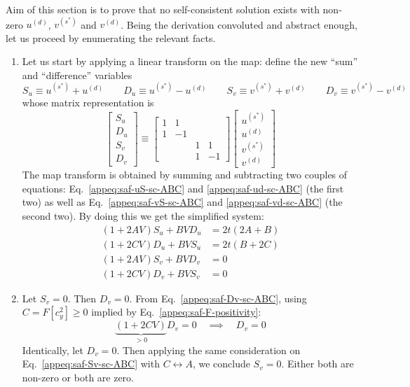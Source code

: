 Aim of this section is to prove that no self-consistent solution exists with non-zero $u^{(d)}$, $v^{(s^*)}$ and $v^{(d)}$. Being the derivation convoluted and abstract enough, let us proceed by enumerating the relevant facts.
\begin{enumerate}
	\item Let us start by applying a linear transform on the map: define the new ``sum'' and ``difference'' variables
	\[
	S_u \equiv u^{(s^*)} + u^{(d)}
	\qquad
	D_u \equiv u^{(s^*)} - u^{(d)}
	\qquad
	S_v \equiv v^{(s^*)} + v^{(d)}
	\qquad
	D_v \equiv v^{(s^*)} - v^{(d)}
	\]
	whose matrix representation is
	\[
	\begin{bmatrix}
		S_u \\ D_u \\ S_v \\ D_v
	\end{bmatrix} \equiv \begin{bmatrix}
		1 & 1 && \\
		1 & -1 && \\
		&& 1 & 1 \\
		&& 1 & -1
	\end{bmatrix} \begin{bmatrix}
		u^{(s^*)} \\ u^{(d)} \\ v^{(s^*)} \\ v^{(d)}
	\end{bmatrix}
	\]
	The map transform is obtained by summing and subtracting two couples of equations: Eq.~\eqref{appeq:saf-uS-sc-ABC} and \eqref{appeq:saf-ud-sc-ABC} (the first two) as well as Eq.~\eqref{appeq:saf-vS-sc-ABC} and \eqref{appeq:saf-vd-sc-ABC} (the second two). By doing this we get the simplified system:
	\begin{align}
		(1+2AV) S_u + BV D_u &= 2t(2A+B) \label{appeq:saf-Su-sc-ABC} \\
		(1+2CV) D_u + BV S_u &= 2t(B+2C) \label{appeq:saf-Du-sc-ABC} \\
		(1+2AV) S_v + BV D_v &= 0 \label{appeq:saf-Sv-sc-ABC} \\
		(1+2CV) D_v + BV S_v &= 0 \label{appeq:saf-Dv-sc-ABC}
	\end{align}
	\item Let $S_v = 0$. Then $D_v = 0$. From Eq.~\eqref{appeq:saf-Dv-sc-ABC}, using $C = F\left[c_y^2 \right] \ge 0$ implied by Eq.~\eqref{appeq:saf-F-positivity}:
	\[
	\underbrace{(1+2CV)}_{>0} D_v = 0
	\quad\implies\quad
	D_v = 0
	\]
	Identically, let $D_v = 0$. Then applying the same consideration on Eq.~\eqref{appeq:saf-Sv-sc-ABC} with $C \leftrightarrow A$, we conclude $S_v = 0$. Either both are non-zero or both are zero.

\end{enumerate}
